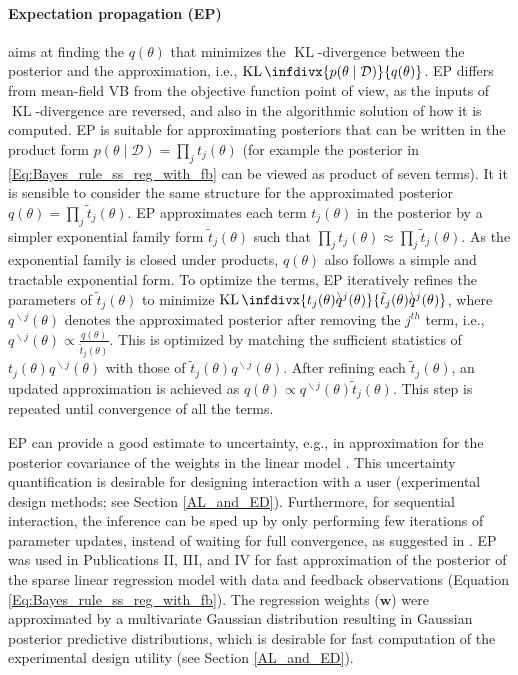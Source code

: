 \documentclass[dissertation,math,vertlayout,pdfa,colorlinks]{aaltoseries}
\newcommand{\bw}{\bm{w}}
\newcommand{\bD}{\mathcal{D}}
\DeclareMathOperator{\KLt}{KL}
\newcommand{\KL}{\KLt\infdivx}
\begin{document}
\paragraph{Expectation propagation (EP)} \cite{minka2001expectation} aims at finding the $q(\theta)$ that minimizes the $\KLt$-divergence between the posterior and the approximation, i.e., $\KL{p(\theta \mid \bD)}{q(\theta)}$. EP differs from mean-field VB from the objective function point of view, as the inputs of $\KLt$-divergence are reversed, and also in the algorithmic solution of how it is computed. %
EP is suitable for approximating posteriors that can be written in the product form %
$p(\theta \mid \bD) = \prod_{j} t_j(\theta)$ (for example the posterior in \ref{Eq:Bayes_rule_ss_reg_with_fb} can be viewed as product of seven terms). It it is sensible to consider the same structure for the approximated posterior $q(\theta) = \prod_{j} \tilde{t}_j(\theta)$. %
EP approximates each term $t_j(\theta)$ in the posterior by a simpler exponential family form $\tilde{t}_j(\theta)$ such that $\prod_{j} t_j(\theta) \approx \prod_{j}\tilde{t}_j(\theta)$. As the exponential family is closed under products, $q(\theta)$ also follows a simple and tractable exponential form. To optimize the terms, EP iteratively refines the parameters of $\tilde{t}_j(\theta)$ to minimize $\KL{t_j(\theta) q^{\!\!\!\backslash j}(\theta)} {\tilde{t}_j(\theta) q^{\!\!\!\backslash j}(\theta)}$, where $q^{\!\!\!\backslash j}(\theta)$ denotes the approximated posterior after removing the $j^{th}$ term, i.e.,  $q^{\!\!\!\backslash j}(\theta) \propto \frac{q(\theta)}{\tilde{t}_j(\theta)}$. This is optimized by matching the sufficient statistics of $t_j(\theta) q^{\!\!\!\backslash j}(\theta)$ with those of $\tilde{t}_j(\theta) q^{\!\!\!\backslash j}(\theta)$. After refining each $\tilde{t}_j(\theta)$, an updated approximation is achieved as $q(\theta)\propto q^{\!\!\!\backslash j}(\theta) \tilde{t}_j(\theta)$. This step is repeated until convergence of all the terms. \cite{hernandez2013generalized,Lobato2015ML,Tomi_P_thesis}
	
EP can provide a good estimate to uncertainty, e.g., in approximation for the posterior covariance of the weights in the linear model \cite{hernandez2013generalized}. This uncertainty quantification is desirable for designing interaction with a user (experimental design methods; see Section \ref{AL_and_ED}). Furthermore, for sequential interaction, the inference can be sped up by only performing few iterations of parameter updates, instead of waiting for full convergence, as suggested in \cite{seeger2008bayesian}. EP was used in Publications II, III, and IV for fast approximation of the posterior of the sparse linear regression model %
with data and feedback observations (Equation \ref{Eq:Bayes_rule_ss_reg_with_fb}). The regression weights ($\bw$) were approximated by a multivariate Gaussian distribution resulting in Gaussian posterior predictive distributions, which is desirable for fast computation of the experimental design utility (see Section \ref{AL_and_ED}).  
	
\end{document}

